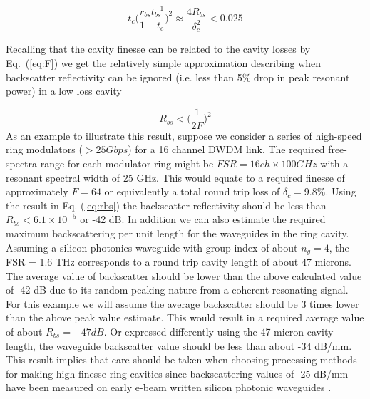 \documentclass[10pt]{article}
\begin{document}
\begin{equation}
t_c \Big(\frac{r_{bs} t_{bs}^{-1}}{1-t_c}\Big)^2  \approx \frac{4 R_{bs}}{\delta_c^2} < 0.025  
\end{equation}

\noindent
Recalling that the cavity finesse can be related to the cavity losses by Eq.~(\ref{eq:F}) we get the relatively simple approximation describing  when backscatter reflectivity can be ignored (i.e. less than 5\% drop in peak resonant power) in a low loss cavity

\begin{equation}
R_{bs} < \Big(\frac{1}{2F}\Big)^2
\label{eq:rbs}
\end{equation}
\noindent
As an example to illustrate this result, suppose we consider a series of high-speed ring modulators ($ > 25  Gbps$) for a 16 channel DWDM link.
The required free-spectra-range for each modulator ring might be $ FSR = 16ch \times{100GHz}$ with a resonant spectral width of 25 GHz.
This would equate to a required finesse of approximately  $ F = 64 $   or equivalently a total round trip loss of $ \delta_c = 9.8\% $.
Using the result in Eq. (\ref{eq:rbs}) the backscatter reflectivity should be less than $ R_{bs} < 6.1 \times 10^{-5}  $ or -42 dB.
In addition we can also estimate the required maximum backscattering per unit length for the waveguides in the ring cavity. Assuming a silicon photonics waveguide with group index of about $n_g=4$, the FSR = 1.6 THz corresponds to a round trip cavity length of about 47 microns.
The average value of backscatter should be lower than the above calculated value of -42 dB due to its  random peaking nature from a coherent resonating signal.   For this example we will assume the average backscatter should be 3 times lower than the above peak value estimate.
This would result in a required average value of about $ R_{bs}  = -47 dB  $.
Or expressed differently using the 47 micron cavity length, the waveguide backscatter value should be less than about -34 dB/mm.
This result implies that care should be taken when choosing processing methods for making high-finesse ring cavities since backscattering values of -25 dB/mm have been measured on early e-beam written silicon photonic waveguides \cite{Melati2014a}. 
\end{document}
